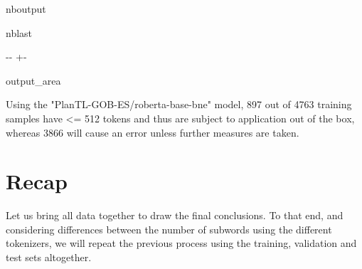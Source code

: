 \documentclass[letterpaper,10pt,english]{sphinxmanual}
\newlength\nbsphinxcodecellspacing
\begin{document}
\begin{sphinxuseclass}{nboutput}
\begin{sphinxuseclass}{nblast}
{

\kern-\sphinxverbatimsmallskipamount\kern-\baselineskip
\kern+\FrameHeightAdjust\kern-\fboxrule
\vspace{\nbsphinxcodecellspacing}

\begin{sphinxuseclass}{output_area}
\begin{sphinxuseclass}{}


\begin{sphinxVerbatim}[commandchars=\\\{\}]
Using the "PlanTL-GOB-ES/roberta-base-bne" model, 897 out of 4763 training samples have <= 512 tokens and thus are subject to application out of the box, whereas 3866 will cause an error unless further measures are taken.
\end{sphinxVerbatim}



\end{sphinxuseclass}
\end{sphinxuseclass}
}

\end{sphinxuseclass}
\end{sphinxuseclass}

\section{Recap}
\label{\detokenize{eda:Recap}}
\sphinxAtStartPar
Let us bring all data together to draw the final conclusions. To that end, and considering differences between the number of subwords using the different tokenizers, we will repeat the previous process using the training, validation and test sets altogether.
\end{document}
